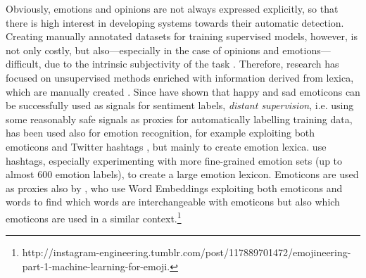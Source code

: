 \documentclass[11pt]{article}
\begin{document}
Obviously, emotions and opinions are not always expressed explicitly, so that there is high interest in developing systems towards their automatic detection. Creating manually annotated datasets for training supervised models, however, is not only costly, but also---especially in the case of opinions and emotions---difficult, due to the intrinsic subjectivity of the task \cite{strapparava2008learning,kim2010evaluation}. Therefore, research has focused on unsupervised methods enriched with information derived from lexica, which are manually created \cite{chaffar2011using,kim2010evaluation}. Since  have shown that happy and sad emoticons can be successfully used as signals for sentiment labels, \textit{distant supervision}, i.e.  using some reasonably safe signals as proxies for automatically labelling training data, has been used also for emotion recognition, for example exploiting both emoticons and Twitter hashtags \cite{purver2012experimenting}, but mainly to create emotion lexica.  use hashtags, especially experimenting with more fine-grained emotion sets (up to almost 600 emotion labels), to create a large emotion lexicon. Emoticons are used as proxies also by , who use Word Embeddings exploiting both emoticons and words to find which words are interchangeable with emoticons but also which emoticons are used in a similar context.\footnote{{http://instagram-engineering.tumblr.com/post/117889701472/emojineering-part-1-machine-learning-for-emoji}.}


%
%
%
%
\end{document}

